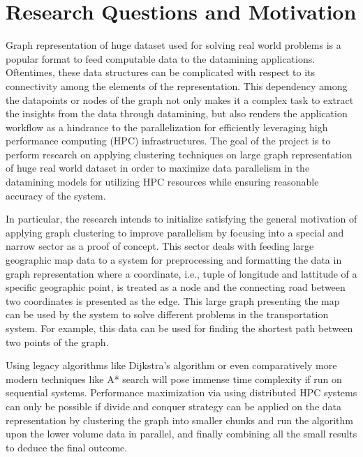 \section{Research Questions and Motivation}
\label{sec:motivation}

Graph representation of huge dataset used for solving real world problems
is a popular format to feed computable data to the datamining applications.
Oftentimes, these data structures can be complicated with respect to its
connectivity among the elements of the representation. This dependency
among the datapoints or nodes of the graph not only makes it a complex task
to extract the insights from the data through datamining, but also renders
the application workflow as a hindrance to the parallelization for
efficiently leveraging high performance computing (HPC) infrastructures.
The goal of the project is to perform research on applying clustering
techniques on large graph representation of huge real world dataset
in order to maximize data parallelism in the datamining models for
utilizing HPC resources while ensuring reasonable accuracy of the system.

In particular, the research intends to initialize satisfying the general
motivation of applying graph clustering to improve parallelism
by focusing into a special and narrow sector as a proof of concept.
This sector deals with feeding large geographic map data to a system
for preprocessing and formatting the data in graph representation
where a coordinate, i.e., tuple of longitude and lattitude of
a specific geographic point, is treated as a node and the connecting
road between two coordinates is presented as the edge.
This large graph presenting the map can be used by the system to
solve different problems in the transportation system. For example,
this data can be used for finding the shortest path between two points of the graph.

Using legacy algorithms like Dijkstra's algorithm or even comparatively
more modern techniques like A* search will pose
immense time complexity if run on sequential systems.
Performance maximization via using distributed HPC systems can only be possible
if divide and conquer strategy can be applied on the data representation
by clustering the graph into smaller chunks and run the algorithm
upon the lower volume data in parallel, and finally combining
all the small results to deduce the final outcome.

